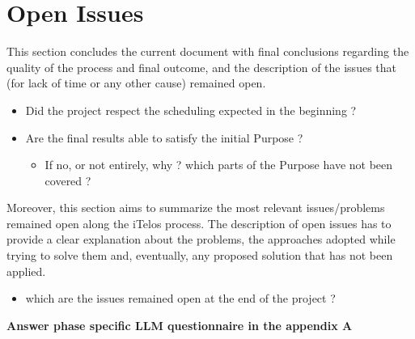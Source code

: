 \section{Open Issues}

This section concludes the current document with final conclusions regarding the quality of the process and final outcome, and the description of the issues that (for lack of time or any other cause) remained open.\\

\begin{itemize}
    \item Did the project respect the scheduling expected in the beginning ?
    \item Are the final results able to satisfy the initial Purpose ?
        \begin{itemize}
            \item If no, or not entirely, why ? which parts of the Purpose have not been covered ?
        \end{itemize}
\end{itemize}


\noindent Moreover, this section aims to summarize the most relevant issues/problems remained open along the iTelos process. The description of open issues has to provide a clear explanation about the problems, the approaches adopted while trying to solve them and, eventually, any proposed solution that has not been applied.\\

\begin{itemize}
    \item which are the issues remained open at the end of the project ?
\end{itemize}

\noindent \textbf{Answer phase specific LLM questionnaire in the appendix A}